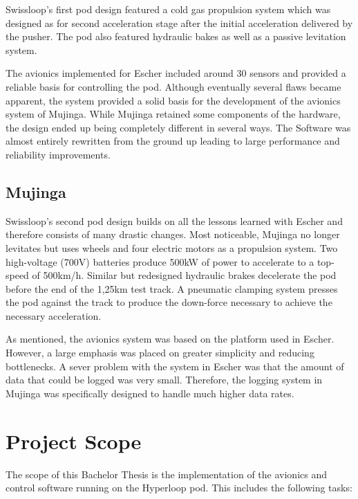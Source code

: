 Swissloop's first pod design featured a cold gas propulsion system which was designed as for second acceleration stage after the initial acceleration delivered by the pusher. The pod also featured hydraulic bakes as well as a passive levitation system.

The avionics implemented for Escher included around 30 sensors and provided a reliable basis for controlling the pod. Although eventually several flaws became apparent, the system provided a solid basis for the development of the avionics system of Mujinga. While Mujinga retained some components of the hardware, the design ended up being completely different in several ways. The Software was almost entirely rewritten from the ground up leading to large performance and reliability improvements.

\subsection{Mujinga}

Swissloop's second pod design builds on all the lessons learned with Escher and therefore consists of many drastic changes. Most noticeable, Mujinga no longer levitates but uses wheels and four electric motors as a propulsion system. Two high-voltage (700V) batteries produce 500kW of power to accelerate to a top-speed of 500km/h. Similar but redesigned hydraulic brakes decelerate the pod before the end of the 1,25km test track. A pneumatic clamping system presses the pod against the track to produce the down-force necessary to achieve the necessary acceleration.

As mentioned, the avionics system was based on the platform used in Escher. However, a large emphasis was placed on greater simplicity and reducing bottlenecks. A sever problem with the system in Escher was that the amount of data that could be logged was very small. Therefore, the logging system in Mujinga was specifically designed to handle much higher data rates.

\section{Project Scope}

The scope of this Bachelor Thesis is the implementation of the avionics and control software running on the Hyperloop pod. This includes the following tasks:


